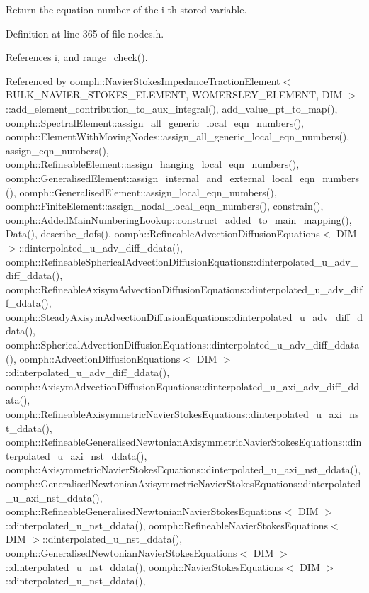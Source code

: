 Return the equation number of the i-\/th stored variable. 



Definition at line 365 of file nodes.\+h.



References i, and range\+\_\+check().



Referenced by oomph\+::\+Navier\+Stokes\+Impedance\+Traction\+Element$<$ B\+U\+L\+K\+\_\+\+N\+A\+V\+I\+E\+R\+\_\+\+S\+T\+O\+K\+E\+S\+\_\+\+E\+L\+E\+M\+E\+N\+T, W\+O\+M\+E\+R\+S\+L\+E\+Y\+\_\+\+E\+L\+E\+M\+E\+N\+T, D\+I\+M $>$\+::add\+\_\+element\+\_\+contribution\+\_\+to\+\_\+aux\+\_\+integral(), add\+\_\+value\+\_\+pt\+\_\+to\+\_\+map(), oomph\+::\+Spectral\+Element\+::assign\+\_\+all\+\_\+generic\+\_\+local\+\_\+eqn\+\_\+numbers(), oomph\+::\+Element\+With\+Moving\+Nodes\+::assign\+\_\+all\+\_\+generic\+\_\+local\+\_\+eqn\+\_\+numbers(), assign\+\_\+eqn\+\_\+numbers(), oomph\+::\+Refineable\+Element\+::assign\+\_\+hanging\+\_\+local\+\_\+eqn\+\_\+numbers(), oomph\+::\+Generalised\+Element\+::assign\+\_\+internal\+\_\+and\+\_\+external\+\_\+local\+\_\+eqn\+\_\+numbers(), oomph\+::\+Generalised\+Element\+::assign\+\_\+local\+\_\+eqn\+\_\+numbers(), oomph\+::\+Finite\+Element\+::assign\+\_\+nodal\+\_\+local\+\_\+eqn\+\_\+numbers(), constrain(), oomph\+::\+Added\+Main\+Numbering\+Lookup\+::construct\+\_\+added\+\_\+to\+\_\+main\+\_\+mapping(), Data(), describe\+\_\+dofs(), oomph\+::\+Refineable\+Advection\+Diffusion\+Equations$<$ D\+I\+M $>$\+::dinterpolated\+\_\+u\+\_\+adv\+\_\+diff\+\_\+ddata(), oomph\+::\+Refineable\+Spherical\+Advection\+Diffusion\+Equations\+::dinterpolated\+\_\+u\+\_\+adv\+\_\+diff\+\_\+ddata(), oomph\+::\+Refineable\+Axisym\+Advection\+Diffusion\+Equations\+::dinterpolated\+\_\+u\+\_\+adv\+\_\+diff\+\_\+ddata(), oomph\+::\+Steady\+Axisym\+Advection\+Diffusion\+Equations\+::dinterpolated\+\_\+u\+\_\+adv\+\_\+diff\+\_\+ddata(), oomph\+::\+Spherical\+Advection\+Diffusion\+Equations\+::dinterpolated\+\_\+u\+\_\+adv\+\_\+diff\+\_\+ddata(), oomph\+::\+Advection\+Diffusion\+Equations$<$ D\+I\+M $>$\+::dinterpolated\+\_\+u\+\_\+adv\+\_\+diff\+\_\+ddata(), oomph\+::\+Axisym\+Advection\+Diffusion\+Equations\+::dinterpolated\+\_\+u\+\_\+axi\+\_\+adv\+\_\+diff\+\_\+ddata(), oomph\+::\+Refineable\+Axisymmetric\+Navier\+Stokes\+Equations\+::dinterpolated\+\_\+u\+\_\+axi\+\_\+nst\+\_\+ddata(), oomph\+::\+Refineable\+Generalised\+Newtonian\+Axisymmetric\+Navier\+Stokes\+Equations\+::dinterpolated\+\_\+u\+\_\+axi\+\_\+nst\+\_\+ddata(), oomph\+::\+Axisymmetric\+Navier\+Stokes\+Equations\+::dinterpolated\+\_\+u\+\_\+axi\+\_\+nst\+\_\+ddata(), oomph\+::\+Generalised\+Newtonian\+Axisymmetric\+Navier\+Stokes\+Equations\+::dinterpolated\+\_\+u\+\_\+axi\+\_\+nst\+\_\+ddata(), oomph\+::\+Refineable\+Generalised\+Newtonian\+Navier\+Stokes\+Equations$<$ D\+I\+M $>$\+::dinterpolated\+\_\+u\+\_\+nst\+\_\+ddata(), oomph\+::\+Refineable\+Navier\+Stokes\+Equations$<$ D\+I\+M $>$\+::dinterpolated\+\_\+u\+\_\+nst\+\_\+ddata(), oomph\+::\+Generalised\+Newtonian\+Navier\+Stokes\+Equations$<$ D\+I\+M $>$\+::dinterpolated\+\_\+u\+\_\+nst\+\_\+ddata(), oomph\+::\+Navier\+Stokes\+Equations$<$ D\+I\+M $>$\+::dinterpolated\+\_\+u\+\_\+nst\+\_\+ddata(), 